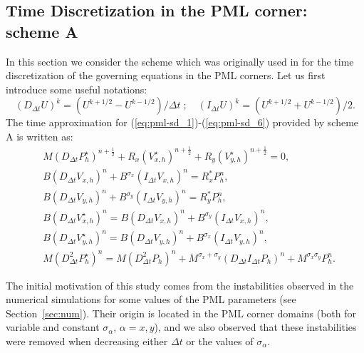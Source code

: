 \documentclass[a4paper]{article}
\def\Vs{V^{\star}}
\def\Ps{P^{\star}}
\begin{document}
\subsection{Time Discretization in the PML corner: { scheme A}}
In this section we consider the scheme which was originally used in \cite{fauqueux}
for the time discretization of the governing equations in the PML corners.
Let us first introduce some useful notations: 
\[
(D_{\Delta t} U)^k = (U^{k+1/2}-U^{k-1/2})/\Delta t \; ; \quad 
(I_{\Delta
  t} {U})^k=(U^{k+1/2}+U^{k-1/2})/2.
\]
The time approximation for (\ref{eq:pml-sd_1})-(\ref{eq:pml-sd_6}) 
provided by scheme A is written as:
\begin{align*}
&M(D_{\Delta t}\Ps_{h})^{n+\frac12}+R_{x}(\Vs_{x,h})^{n+\frac12}+R_{y}(\Vs_{y,h})^{n+\frac12}=0,\\
&B(D_{\Delta t} V_{x,h})^{n} +  B^{\sigma_x} (I_{\Delta t} V_{x,h})^{n}=R_{x}^{*}P_{h}^{n},\\
&B(D_{\Delta t} V_{y,h})^{n}+ B^{\sigma_y} (I_{\Delta t}V_{y,h})^{n} =R_{y}^{*}P_{h}^{n},\\
&B(D_{\Delta t}\Vs_{x,h})^{n}=B(D_{\Delta t} V_{x,h})^n + B^{\sigma_y}
(I_{\Delta t}V_{x,h})^n ,\\
&B(D_{\Delta t}\Vs_{y,h})^{n}=B(D_{\Delta t} V_{y,h})^n + B^{\sigma_x}
(I_{\Delta t} V_{y,h})^n,\\
&M(D_{\Delta t}^{2}\Ps_{h})^{n}=M(D_{\Delta t}^2
P_{h})^{n}+ M^{\sigma_x+\sigma_y}   (D_{\Delta t} I_{\Delta t}
{P_{h}})^{n}+    M^{\sigma_x \sigma_y}  P_{h}^{n}.
\end{align*}

The initial motivation of this study comes from the instabilities
observed in the numerical simulations for some values of the PML 
parameters (see Section~\ref{sec:num}). Their origin is located in the 
PML corner domains (both for variable and constant $\sigma_\alpha$, $\alpha=x,y$), 
and we also observed that these instabilities were removed when decreasing
either $\Delta t$ or the values of $\sigma_\alpha$. 
\end{document}
